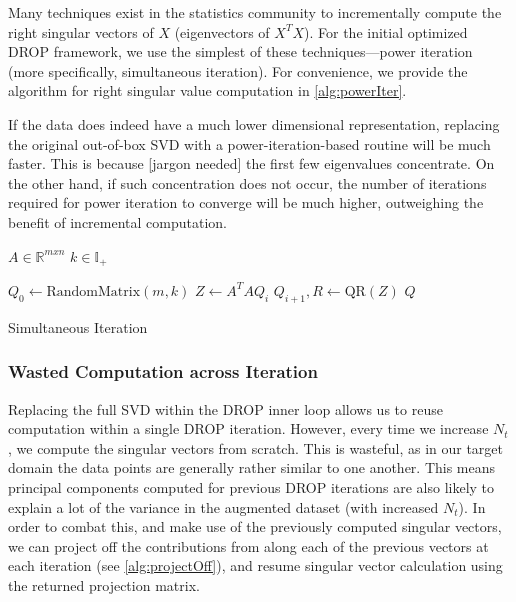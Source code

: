 Many techniques exist in the statistics community to incrementally compute the right singular vectors of $X$ (eigenvectors of $X^TX$). For the initial optimized DROP framework, we use the simplest of these techniques---power iteration (more specifically, simultaneous iteration). For convenience, we provide the algorithm for right singular value computation in \ref{alg:powerIter}. 

If the data does indeed have a much lower dimensional representation, replacing the original out-of-box SVD with a power-iteration-based routine will be much faster. This is because [jargon needed] the first few eigenvalues concentrate. On the other hand, if such concentration does not occur, the number of iterations required for power iteration to converge will be much higher, outweighing the benefit of incremental computation. 

\begin{algorithm}
\begin{algorithmic}
\State $A \in \mathbb{R}^{mxn}$
\State $k \in \mathbb{I_+}$
	
	\State $Q_0 \gets \text{RandomMatrix}(m,k)$ 
		\State $Z \gets A^TAQ_i$
		\State $Q_{i+1},R \gets \text{QR}(Z)$
	\EndWhile
	\Return $Q$
\EndFunction
\end{algorithmic}
\caption{Simultaneous Iteration}
\label{alg:powerIter}
\end{algorithm}

\subsubsection{Wasted Computation across Iteration}

Replacing the full SVD within the DROP inner loop allows us to reuse computation within a single DROP iteration. However, every time we increase $N_t$, we  compute the singular vectors from scratch. This is wasteful, as in our target domain the data points are generally rather similar to one another. This means principal components computed for previous DROP iterations are also likely to explain a lot of the variance in the augmented dataset (with increased $N_t$). In order to combat this, and make use of the previously computed singular vectors, we can project off the contributions from along each of the previous vectors at each iteration (see \ref{alg:projectOff}), and resume singular vector calculation using the returned projection matrix. 

